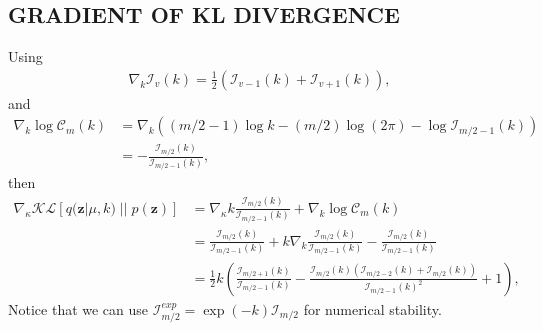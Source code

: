 \documentclass[letterpaper]{article}
\newcommand{\z}{\mathbf{z}}
\begin{document}
\subsection{GRADIENT OF KL DIVERGENCE}
Using
\begin{align}
\nabla_k \mathcal{I}_{v}(k) = \frac12 \left(\mathcal{I}_{v-1}(k) + \mathcal{I}_{v+1}(k) \right),
\end{align}
and
\begin{align}
\nabla_k \log \mathcal{C}_m(k) &=
\nabla_k \left( (m/2 - 1) \log k - (m/2) \log(2\pi) - \log \mathcal{I}_{m/2 - 1}(k)  \right) \\
&= - \frac{\mathcal{I}_{m/2}(k)}{\mathcal{I}_{m/2 - 1}(k)},
\end{align}
then
\begin{align}
    \nabla_\kappa \mathcal{KL}[q(\z|\mu, k) \; || \;p(\z)] &= \nabla_\kappa k \frac{\mathcal{I}_{m/2}(k)}{\mathcal{I}_{m/2 - 1}(k)} + \nabla_k \log \mathcal{C}_m(k)   \\
    & = \frac{\mathcal{I}_{m/2}(k)}{\mathcal{I}_{m/2 - 1}(k)} + k \nabla_k  \frac{\mathcal{I}_{m/2}(k)}{\mathcal{I}_{m/2 - 1}(k)} - \frac{\mathcal{I}_{m/2}(k)}{\mathcal{I}_{m/2 - 1}(k)}  \\
    &= \frac12 k \left( \frac{\mathcal{I}_{m/2+1}(k)}{\mathcal{I}_{m/2 - 1}(k)} - \frac{\mathcal{I}_{m/2}(k) \left( \mathcal{I}_{m/2 - 2}(k) + \mathcal{I}_{m/2}(k) \right) }{\mathcal{I}_{m/2 - 1}(k)^2} + 1 \right),
\end{align}
Notice that we can use $\mathcal{I}_{m/2}^{exp} = \exp(-k)\mathcal{I}_{m/2}$ for numerical stability.
\end{document}
